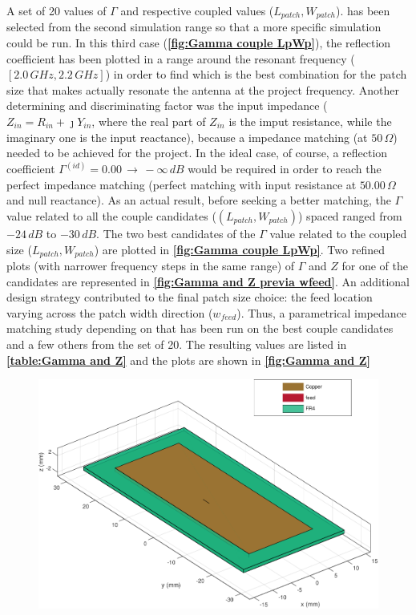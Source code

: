 \documentclass[12pt,a4paper]{article}
\begin{document}
{\begin{multicols}{2}
A set of 20 values of $\Gamma$ and respective coupled values ($L_{patch},W_{patch}$). has been selected from the second simulation range so that a more specific simulation could be run. In this third case (\textbf{\cref{fig:Gamma couple LpWp}}), the reflection coefficient has been plotted in a range around the resonant frequency ($[2.0\,GHz, 2.2\,GHz]$) in order to find which is the best combination for the patch size that makes actually resonate the antenna at the project frequency. Another determining and discriminating factor was the input impedance ($Z_{in}=R_{in}+\jmath Y_{in}$, where the real part of $Z_{in}$ is the imput resistance, while the imaginary one is the input reactance), because a impedance matching (at $50\,\Omega$) needed to be achieved for the project. In the ideal case, of course, a reflection coefficient $\Gamma^{(id)}=0.00\,\to\,-\infty\,dB$ would be required in order to reach the perfect impedance matching (perfect matching with input resistance at $50.00\,\Omega$ and null reactance). As an actual result, before seeking a better matching, the $\Gamma$ value related to all the couple candidates ($(L_{patch},W_{patch})$) spaced ranged from $-24\,dB$ to $-30\,dB$. The two best candidates of the $\Gamma$ value related to the coupled size ($L_{patch},W_{patch}$) are plotted in \textbf{\cref{fig:Gamma couple LpWp}}. Two refined plots (with narrower frequency steps in the same range) of $\Gamma$ and $Z$ for one of the candidates are represented in \textbf{\cref{fig:Gamma and Z previa wfeed}}. An additional design strategy contributed to the final patch size choice: the feed location varying across the patch width direction ($w_{feed}$). Thus, a parametrical impedance matching study depending on that has been run on the best couple candidates and a few others from the set of 20. The resulting values are listed in \textbf{\cref{table:Gamma and Z}} and the plots are shown in \textbf{\cref{fig:Gamma and Z}}
\end{multicols}
\begin{figure}[h]
\begin{center}
\includegraphics[scale=0.35]{patch_structure.pdf}

\end{center}
\end{figure}}
\end{document}
